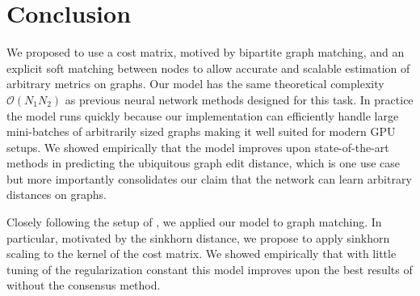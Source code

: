 \section{Conclusion}


We proposed to use a cost matrix, motived by bipartite graph matching, and an explicit soft matching between nodes to allow accurate and scalable estimation of arbitrary metrics on graphs. Our model has the same theoretical complexity $\mathcal{O}(N_1 N_2)$ as previous neural network methods designed for this task. In practice the model runs quickly because our implementation can efficiently handle large mini-batches of arbitrarily sized graphs making it well suited for modern GPU setups. We showed empirically that the model improves upon state-of-the-art methods in predicting the ubiquitous graph edit distance, which is one use case but more importantly consolidates our claim that the network can learn arbitrary distances on graphs.



Closely following the setup of \cite{fey2020_update}, we applied our  model to graph matching. In particular, motivated by the sinkhorn distance, we propose to apply sinkhorn scaling to the kernel of the cost matrix. We showed empirically that with little tuning of the regularization constant this model improves upon the best results of \cite{fey2020_update} without the consensus method.

